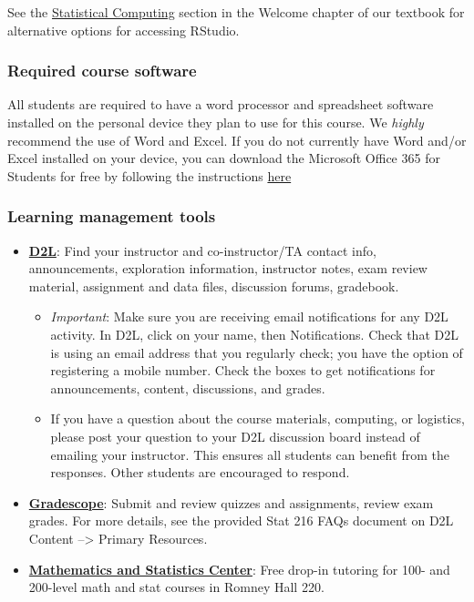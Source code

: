 \documentclass[
]{article}
\providecommand{\tightlist}{%
  \setlength{\itemsep}{0pt}\setlength{\parskip}{0pt}}
\begin{document}
See the
\href{https://mtstateintrostats.github.io/IntroStatTextbook/rstudio.html\#alternative-options-for-accessing-rstudio}{Statistical
Computing} section in the Welcome chapter of our textbook for
alternative options for accessing RStudio.

\subsubsection{Required course software}\label{required-course-software}

All students are required to have a word processor and spreadsheet
software installed on the personal device they plan to use for this
course. We \emph{highly} recommend the use of Word and Excel. If you do
not currently have Word and/or Excel installed on your device, you can
download the Microsoft Office 365 for Students for free by following the
instructions
\href{https://coe.montana.edu/it/students/student-software.html}{here}

\subsubsection{Learning management
tools}\label{learning-management-tools}

\begin{itemize}
\item
  \href{https://ecat1.montana.edu/}{\textbf{D2L}}: Find your instructor
  and co-instructor/TA contact info, announcements, exploration
  information, instructor notes, exam review material, assignment and
  data files, discussion forums, gradebook.

  \begin{itemize}
  \tightlist
  \item
    \emph{Important}: Make sure you are receiving email notifications
    for any D2L activity. In D2L, click on your name, then
    Notifications. Check that D2L is using an email address that you
    regularly check; you have the option of registering a mobile number.
    Check the boxes to get notifications for announcements, content,
    discussions, and grades.
  \item
    If you have a question about the course materials, computing, or
    logistics, please post your question to your D2L discussion board
    instead of emailing your instructor. This ensures all students can
    benefit from the responses. Other students are encouraged to
    respond.
  \end{itemize}
\item
  \href{https://www.gradescope.com/}{\textbf{Gradescope}}: Submit and
  review quizzes and assignments, review exam grades. For more details,
  see the provided Stat 216 FAQs document on D2L Content
  --\textgreater{} Primary Resources.
\item
  \href{https://math.montana.edu/undergrad/msc/index.html}{\textbf{Mathematics
  and Statistics Center}}: Free drop-in tutoring for 100- and 200-level
  math and stat courses in Romney Hall 220.
\end{itemize}
\end{document}
